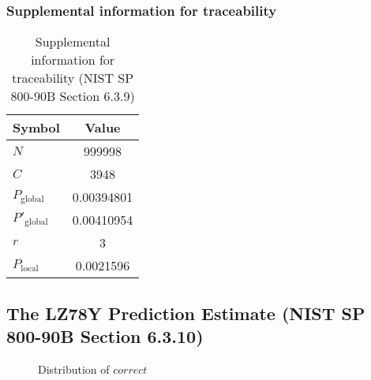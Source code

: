 \documentclass[a3paper,xelatex,english]{bxjsarticle}
\begin{document}
\subsubsection{Supplemental information for traceability}
\renewcommand{\arraystretch}{1.8}
\begin{table}[h]
\caption{Supplemental information for traceability (NIST SP 800-90B Section 6.3.9)}
\begin{center}
\begin{tabular}{|l|c|}
\hline 
\rowcolor{anotherlightblue} %
Symbol				& Value \\ \hline 
$N$				& 999998\\ \hline 
$C$				& 3948\\ \hline 
$P_{\textrm{global}}$				& 0.00394801\\ \hline 
$P'_{\textrm{global}}$			& 0.00410954\\ \hline 
$r$				& 3\\ \hline 
$P_{\textrm{local}}$ 			& 0.0021596\\ \hline
\end{tabular}
\end{center}
\end{table}
\renewcommand{\arraystretch}{1.4}
\clearpage
\subsection{The LZ78Y Prediction Estimate (NIST SP 800-90B Section 6.3.10)}\label{sec:NonBinary6310}

\begin{figure}[htbp]
\centering

\caption{Distribution of $correct$}
\end{figure}
\end{document}

